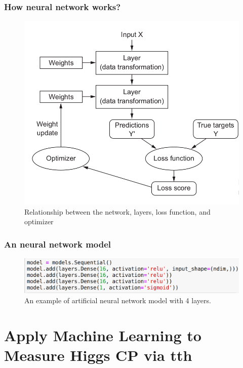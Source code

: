 \documentclass{beamer}
\begin{document}
\begin{frame}
\frametitle{How neural network works?}
\begin{figure}
\includegraphics[scale=0.25]{./figures/interaction.png}
\caption{Relationship between the network, layers, loss function, and optimizer}
\end{figure}
\end{frame}

\begin{frame}
\frametitle{An neural network model}
\begin{figure}
\includegraphics[scale=0.25]{./figures/model.png}
\caption{An example of artificial neural network model with 4 layers.}
\end{figure}
\end{frame}


\section{Apply Machine Learning to Measure Higgs CP via tth}
\end{document}
